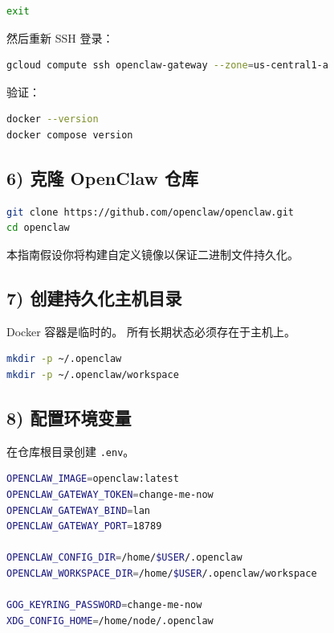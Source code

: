 \begin{lstlisting}[language=bash]
exit
\end{lstlisting}


然后重新 SSH 登录：

\begin{lstlisting}[language=bash]
gcloud compute ssh openclaw-gateway --zone=us-central1-a
\end{lstlisting}


验证：

\begin{lstlisting}[language=bash]
docker --version
docker compose version
\end{lstlisting}


\hrulefill


\subsection{6) 克隆 OpenClaw 仓库}


\begin{lstlisting}[language=bash]
git clone https://github.com/openclaw/openclaw.git
cd openclaw
\end{lstlisting}


本指南假设你将构建自定义镜像以保证二进制文件持久化。

\hrulefill


\subsection{7) 创建持久化主机目录}


Docker 容器是临时的。
所有长期状态必须存在于主机上。

\begin{lstlisting}[language=bash]
mkdir -p ~/.openclaw
mkdir -p ~/.openclaw/workspace
\end{lstlisting}


\hrulefill


\subsection{8) 配置环境变量}


在仓库根目录创建 \texttt{.env}。

\begin{lstlisting}[language=bash]
OPENCLAW_IMAGE=openclaw:latest
OPENCLAW_GATEWAY_TOKEN=change-me-now
OPENCLAW_GATEWAY_BIND=lan
OPENCLAW_GATEWAY_PORT=18789

OPENCLAW_CONFIG_DIR=/home/$USER/.openclaw
OPENCLAW_WORKSPACE_DIR=/home/$USER/.openclaw/workspace

GOG_KEYRING_PASSWORD=change-me-now
XDG_CONFIG_HOME=/home/node/.openclaw
\end{lstlisting}


